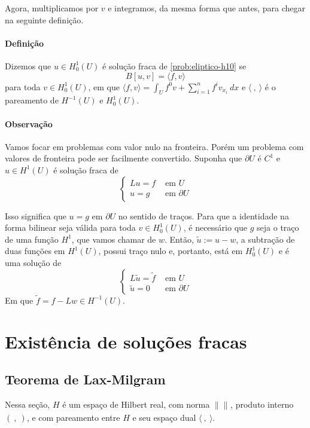 \documentclass[a4paper, 11pt]{book}
\begin{document}
Agora, multiplicamos por $v$ e integramos, da mesma forma que antes, para chegar na seguinte definição.

\paragraph{Definição} Dizemos que $u \in H^1_0(U)$ é solução fraca de \eqref{prob:eliptico-h10} se \[
B[u,v] = \langle f,v \rangle	
\]
para toda $v \in H^1_0(U)$, em que $\langle f, v \rangle = \int_U f^0v + \sum_{i=1}^{n} f^i v_{x_i}\ dx $ e $\langle \ {,} \ \rangle$ é o pareamento de $H^{-1}(U)$ e $H^1_0(U)$.

\paragraph{Observação} Vamos focar em problemas com valor nulo na fronteira. Porém um problema com valores de fronteira pode ser facilmente convertido. Suponha que $\partial U$ é $C^1$ e $u\in H^1(U)$ é solução fraca de \[
\begin{cases}
	Lu=f &\text{ em }U\\
	u=g &\text{ em }\partial U
\end{cases}	
\]

Isso significa que $u=g \text{ em } \partial U$ no sentido de traços. Para que a identidade na forma bilinear seja válida para toda $v \in H^1_0(U)$, é necessário que $g$ seja o traço de uma função $H^1$, que vamos chamar de $w$. Então, $\tilde{u} := u - w$, a subtração de duas funções em $H^1(U)$, possui traço nulo e, portanto, está em $H^1_0(U)$ e é uma solução de 
\[
\begin{cases}
	L\tilde{u} = \tilde{f} &\text{ em } U \\
	\tilde{u} = 0 &\text{ em } \partial U
\end{cases}	
\]
Em que $\tilde{f} = f - Lw \in H^{-1}(U)$.

\section{Existência de soluções fracas}
\subsection{Teorema de Lax-Milgram}

Nessa seção, $H$ é um espaço de Hilbert real, com norma $\|\|_{}$, produto interno $(\ {,} \ )$, e com pareamento entre $H$ e seu espaço dual $\langle \ {,} \ \rangle$.
\end{document}
